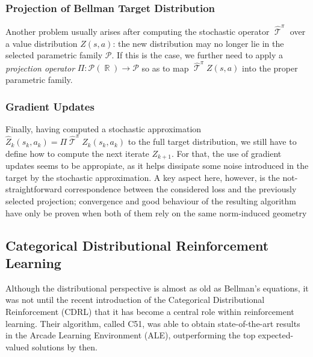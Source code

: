 \documentclass[12pt,a4paper,openright,twoside]{article}
\DeclareMathOperator*{\R}{\mathbb{R}}
\DeclareMathOperator*{\T}{\mathcal{T}}
\numberwithin{equation}{section}
\theoremstyle{definition}
\theoremstyle{remark}
\theoremstyle{plain}
\begin{document}
\subsubsection*{Projection of Bellman Target Distribution}
Another problem usually arises after computing the stochastic operator $\widehat{\T}^\pi$ over a value distribution $Z(s,a)$: the new distribution may no longer lie in the selected parametric family $\mathcal{P}$. If this is the case, we further need to apply a \textit{projection operator} $\Pi : \mathscr{P}(\R) \rightarrow \mathcal{P}$ so as to map $\widehat{\T}^\pi Z(s,a)$ into the proper parametric family.

\subsubsection*{Gradient Updates}
 Finally, having computed a stochastic approximation $\widehat{Z}_k (s_k,a_k) = \Pi \widehat{\T}^\pi Z_k(s_k,a_k)$ to the full target distribution, we still have to define how to compute the next iterate $Z_{k+1}$. For that, the use of gradient updates seems to be appropiate\cite{rlformulation}, as it helps dissipate some noise introduced in the target by the stochastic approximation. A key aspect here, however, is the not-straightforward correspondence between the considered loss and the previously selected projection; convergence and good behaviour of the resulting algorithm have only be proven when both of them rely on the same norm-induced geometry\cite{analysisC51,rlformulation}

\subsection{Categorical Distributional Reinforcement Learning}

Although the distributional perspective is almost as old as Bellman's equations\cite{firstDistributional}, it was not until the recent introduction of the Categorical Distributional Reinforcement\cite{DRL} (CDRL) that it has become a central role within reinforcement learning. Their algorithm, called C51, was able to obtain state-of-the-art results in the Arcade Learning Environment\cite{ALE} (ALE), outperforming the top expected-valued solutions by then.
\end{document}
